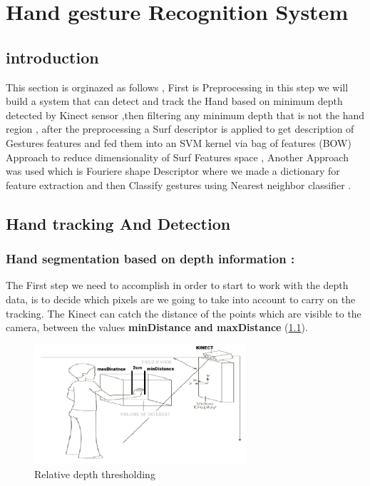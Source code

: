 
\chapter{Hand gesture Recognition System} \label{hgr}

\section{introduction}

This section is orginazed as follows , First is Preprocessing in this step we will build a system that can detect and track the Hand based on minimum depth detected by Kinect sensor ,then filtering any minimum depth that is not the hand region , after the preprocessing  a Surf descriptor is applied to get description of Gestures features  and fed them into an SVM kernel via bag of features (BOW) Approach to reduce dimensionality of Surf Features space , Another Approach was used which is Fouriere shape Descriptor where we made a dictionary for feature extraction and then Classify gestures using Nearest neighbor classifier .



\section{Hand tracking  And Detection}

\subsection{Hand segmentation based on depth information :} \label{depth}

The First step we need to accomplish in order to start to work with the depth data, is to decide which pixels are we going to take into account to carry on the tracking. The Kinect can catch the distance of the points which are visible to the camera, between the values \textbf{minDistance and maxDistance} (\ref{fig:cam8}).

\begin{figure}[H]
\centering
\includegraphics[width=0.7\textwidth]{img/mindistance.png}
\caption{Relative depth thresholding }
\label{fig:cam8}
\end{figure}

